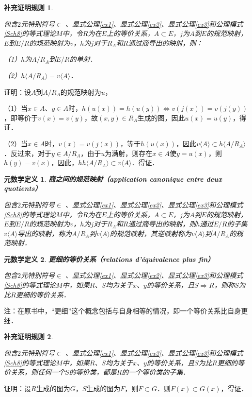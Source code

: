\documentclass[12pt, a4paper, oneside]{book}
\newtheorem{metadef}{元数学定义}
\newtheorem{Ccor}{补充证明规则}
\begin{document}
			\begin{Ccor}\label{Ccor55}
				\hfill\par
				包含$2$元特别符号$\in$ 、显式公理\ref{ex1}、显式公理\ref{ex2}、显式公理\ref{ex3}和公理模式\ref{Sch8}的等式理论$M$中，令$R$为在$E$上的等价关系，$A\subset E$，$j$为$A$到$E$的规范映射，$E$到$E/R$的规范映射为$v$，$h$为$j$对于$R_A$和$R$通过商导出的映射，则：
				\par
				（1）$h$为$A/R_A$到$E/R$的单射．
				\par
				（2）$h\langle A/R_A\rangle =v\langle A \rangle $．
			\end{Ccor}
			证明：设$A$到$A/R_A$的规范映射为$u$，
			\par
			（1）当$x\in A$、$y\in A$时，$h(u(x))=h(u(y))\Leftrightarrow v(j(x))=v(j(y))$，即等价于$v(x)=v(y)$，故$(x, y)\in R_A$生成的图，因此$u(x)=u(y)$，得证．
			\par
			（2）当$x\in A$时，$v(x)=v(j(x))$，等于$h(u(x))$，因此$v\langle A \rangle \subset h\langle A/R_A\rangle$．反过来，对于$y\in A/R_A$，由于$u$为满射，则存在$x\in A$使$y=u(x)$，则$h(y)=v(x)$，因此，$hh\langle A/R_A\rangle\subset v\langle A \rangle $．得证．
			
			\begin{metadef}
				\textbf{商之间的规范映射（application canonique entre deux quotients）}
				\par
				包含$2$元特别符号$\in$ 、显式公理\ref{ex1}、显式公理\ref{ex2}、显式公理\ref{ex3}和公理模式\ref{Sch8}的等式理论$M$中，令$R$为在$E$上的等价关系，$A\subset E$，$j$为$A$到$E$的规范映射，$E$到$E/R$的规范映射为$v$，$h$为$j$对于$R_A$和$R$通过商导出的映射，则$h$通过$E/R$的子集$v\langle A \rangle $导出的映射，称为$A/R_A$到$v\langle A \rangle $的规范映射，其逆映射称为$v\langle A \rangle $到$A/R_A$的规范映射．
			\end{metadef}
									
			\begin{metadef}
				\textbf{更细的等价关系（relations d'équivalence plus fin）}
				\par
				包含$2$元特别符号$\in$ 、显式公理\ref{ex1}、显式公理\ref{ex2}、显式公理\ref{ex3}和公理模式\ref{Sch8}的等式理论$M$中，如果$R$、$S$均为关于$x$、$y$的等价关系，且$S\Rightarrow R$，则称$S$为比$R$更细的等价关系．
			\end{metadef}
			注：在原书中，“更细”这个概念包括与自身相等的情况，即一个等价关系比自身更细．
						
			\begin{Ccor}\label{Ccor56}
				\hfill\par
				包含$2$元特别符号$\in$ 、显式公理\ref{ex1}、显式公理\ref{ex2}、显式公理\ref{ex3}和公理模式\ref{Sch8}的等式理论$M$中，如果$R$、$S$均为关于$x$、$y$的等价关系，且$S$为比$R$更细的等价关系，则任何一个$S$的等价类，都是$R$的一个等价类的子集．
			\end{Ccor}
			证明：设$R$生成的图为$G$，$S$生成的图为$F$，则$F\subset G$．则$F(x)\subset G(x)$，得证．
			
\end{document}
